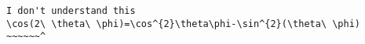 \begin{verbatim}
I don't understand this
\cos(2\ \theta\ \phi)=\cos^{2}\theta\phi-\sin^{2}(\theta\ \phi)
~~~~~~^
\end{verbatim}
